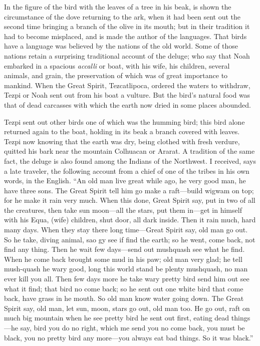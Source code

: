 In the figure of the bird with the leaves of a tree in his beak, is shown the circumstance of the
dove returning to the ark, when it had been sent out the second time bringing a branch of the
olive in its mouth; but in their tradition it had to become misplaced, and is made the author of
the languages. That birds have a language was believed by the nations of the old world. Some
of those nations retain a surprising traditional account of the deluge; who say that Noah
embarked in a spacious \textit{accalli} or boat, with his wife, his children, several animals, and grain,
the preservation of which was of great importance to mankind. When the Great Spirit,
Tezcatlipoca, ordered the waters to withdraw, Tezpi or Noah sent out from his boat a vulture.
But the bird's natural food was that of dead carcasses with which the earth now dried in some
places abounded.

Tezpi sent out other birds one of which was the humming bird; this bird alone returned again
to the boat, holding in its beak a branch covered with leaves. Tezpi now knowing that the
earth was dry, being clothed with fresh verdure, quitted his bark near the mountain
Colhuacan or Ararat. A tradition of the same fact, the deluge is also found among the Indians
of the Northwest. I received, says a late traveler, the following account from a chief of one of
the tribes in his own words, in the English. ``An old man live great while ago, he very good
man, he have three sons. The Great Spirit tell him go make a raft—build wigwam on top; for
he make it rain very much. When this done, Great Spirit say, put in two of all the creatures,
then take sun moon—all the stars, put them in—get in himself with his Equa, (wife) children,
shut door, all dark inside. Then it rain much, hard many days. When they stay there long
time—Great Spirit say, old man go out. So he take, diving animal, sao gy see if find the
earth; so he went, come back, not find any thing. Then he wait few days—send out
mushquash see what he find. When he come back brought some mud in his paw; old man
very glad; he tell mush-quash he wary good, long this world stand be plenty mushquash, no
man ever kill you all. Then few days more he take wary pretty bird send him out see what it
find; that bird no come back; so he sent out one white bird that come back, have grass in he
mouth. So old man know water going down. The Great Spirit say, old man, let sun, moon,
stars go out, old man too. He go out, raft on much big mountain when he see pretty bird he
sent out first, eating dead things—he say, bird you do no right, which me send you no come
back, you must be black, you no pretty bird any more—you always eat bad things. So it was
black.''

